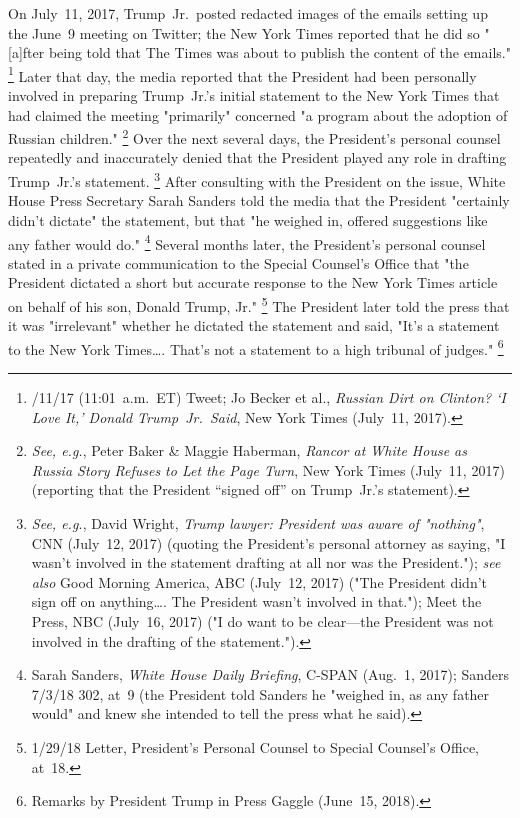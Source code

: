 On July~11, 2017, Trump~Jr.\ posted redacted images of the emails setting up the June~9 meeting on Twitter; the New York Times reported that he did so "[a]fter being told that The Times was about to publish the content of the emails."%
\footnote{/11/17 (11:01~a.m.~ET) Tweet;
Jo Becker et al., \textit{Russian Dirt on Clinton? `I Love It,' Donald Trump~Jr.\ Said}, New York Times (July~11, 2017).}
Later that day, the media reported that the President had been personally involved in preparing Trump~Jr.'s initial statement to the New York Times that had claimed the meeting "primarily" concerned "a program about the adoption of Russian children."%
\footnote{\textit{See, e.g.}, Peter Baker \& Maggie Haberman, \textit{Rancor at White House as Russia Story Refuses to Let the Page Turn}, New York Times (July~11, 2017) (reporting that the President ``signed off'' on Trump~Jr.'s statement).}
Over the next several days, the President's personal counsel repeatedly and inaccurately denied that the President played any role in drafting Trump~Jr.'s statement.%
\footnote{\textit{See, e.g.}, David Wright, \textit{Trump lawyer: President was aware of "nothing"}, CNN (July~12, 2017) (quoting the President's personal attorney as saying, "I wasn't involved in the statement drafting at all nor was the President.");
\textit{see also} Good Morning America, ABC (July~12, 2017) ("The President didn't sign off on anything\dots. The President wasn't involved in that.");
Meet the Press, NBC (July~16, 2017) ("I do want to be clear---the President was not involved in the drafting of the statement.").}
After consulting with the President on the issue, White House Press Secretary Sarah Sanders told the media that the President "certainly didn't dictate" the statement, but that "he weighed in, offered suggestions like any father would do."%
\footnote{Sarah Sanders, \textit{White House Daily Briefing}, C-SPAN (Aug.~1, 2017);
Sanders 7/3/18 302, at~9 (the President told Sanders he "weighed in, as any father would" and knew she intended to tell the press what he said).}
Several months later, the President's personal counsel stated in a private communication to the Special Counsel's Office that "the President dictated a short but accurate response to the New York Times article on behalf of his son, Donald Trump, Jr."%
\footnote{1/29/18 Letter, President's Personal Counsel to Special Counsel's Office, at~18.}
The President later told the press that it was "irrelevant" whether he dictated the statement and said, "It's a statement to the New York Times\dots. That's not a statement to a high tribunal of judges."%
\footnote{Remarks by President Trump in Press Gaggle (June~15, 2018).}

